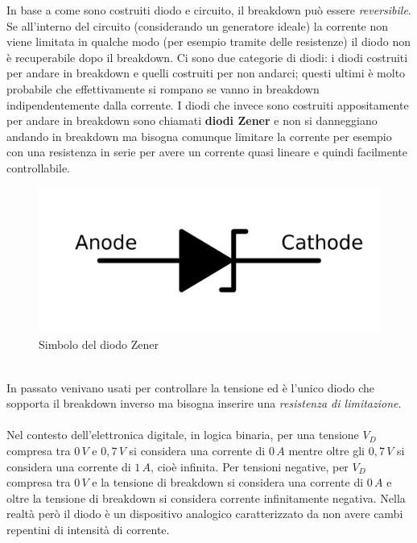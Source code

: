 \documentclass[12pt, a4paper]{report}
\begin{document}
In base a come sono costruiti diodo e circuito, il breakdown può essere \textit{reversibile}. Se all'interno del circuito (considerando un generatore ideale) la corrente non viene limitata in qualche modo (per esempio tramite delle resistenze) il diodo non è recuperabile dopo il breakdown. Ci sono due categorie di diodi: i diodi costruiti per andare in breakdown e quelli costruiti per non andarci; questi ultimi è molto probabile che effettivamente si rompano se vanno in breakdown indipendentemente dalla corrente. I diodi che invece sono costruiti appositamente per andare in breakdown sono chiamati \textbf{diodi Zener} e non si danneggiano andando in breakdown ma bisogna comunque limitare la corrente per esempio con una resistenza in serie per avere un corrente quasi lineare e quindi facilmente controllabile.
\begin{figure}[h]
\centering
\includegraphics[scale=0.15,angle=0]{diodo_zener.png}
\caption{Simbolo del diodo Zener}
\end{figure}
\\In passato venivano usati per controllare la tensione ed è l'unico diodo che sopporta il breakdown inverso ma bisogna inserire una \textit{resistenza di limitazione}.
\\\\Nel contesto dell'elettronica digitale, in logica binaria, per una tensione $V_{D}$ compresa tra $0\,V$ e $0,7\,V$ si considera una corrente di $0\,A$ mentre oltre gli $0,7\,V$ si considera una corrente di $1\,A$, cioè infinita. Per tensioni negative, per $V_{D}$ compresa tra $0\,V$ e la tensione di breakdown si considera una corrente di $0\,A$ e oltre la tensione di breakdown si considera corrente infinitamente negativa. Nella realtà però il diodo è un dispositivo analogico caratterizzato da non avere cambi repentini di intensità di corrente.
\end{document}
